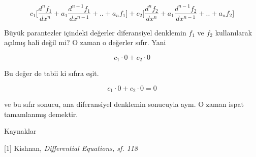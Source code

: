 \documentclass[12pt,fleqn]{article}\usepackage{../../common}
\begin{document}
$$ 
c_1 \bigg[
\frac{d^nf_1}{dx^n} + a_1 \frac{d^{n-1}f_1}{dx^{n-1}} + .. + a_n f_1
\bigg] +
c_2 \bigg[
\frac{d^nf_2}{dx^n} + a_1 \frac{d^{n-1}f_2}{dx^{n-1}} + .. + a_n f_2
\bigg]
 $$

Büyük parantezler içindeki değerler diferansiyel denklemin $f_1$ ve $f_2$
kullanılarak açılmış hali değil mi? O zaman o değerler sıfır. Yani

$$ c_1 \cdot 0 + c_2 \cdot 0 $$

Bu değer de tabii ki sıfıra eşit. 

$$ c_1 \cdot 0 + c_2 \cdot 0 = 0$$

ve bu sıfır sonucu, ana diferansiyel denklemin sonucuyla aynı. O zaman ispat
tamamlanmış demektir.

Kaynaklar 

[1] Kishnan, {\em Differential Equations, sf. 118}
\end{document}
